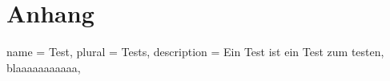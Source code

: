 \chapter{Anhang}
\printglossaries
{}
{
  name = Test,
  plural = Tests,
  description = {Ein Test ist ein Test zum testen, blaaaaaaaaaaa},
}
